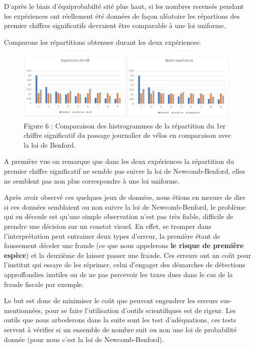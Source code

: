 \documentclass[
  12pt,
]{article}
\begin{document}
D'après le biais d'équiprobabilté sité plus haut, si les nombres
recensés pendant les expériences ont réellement été données de façon
aléatoire les répartions des premier chiffres significatifs devraient
être comparable à une loi uniforme.

Comparons les répartitions obtenues durant les deux expériences:

\begin{figure}
\centering
\includegraphics{Images/comparaison.png}
\caption{Figure 6 : Comparaison des histrogrammes de la répartition du
1er chiffre significatif du passage journalier de vélos en comparaison
avec la loi de Benford.}
\end{figure}

A première vue on remarque que dans les deux expériences la répartition
du premier chiffre significatif ne semble pas suivre la loi de
Newcomb-Benford, elles ne semblent pas non plus correspondre à une loi
uniforme.

Après avoir observé ces quelques jeux de données, nous étions en mesure
de dire si ces données semblaient ou non suivre la loi de
Newcomb-Benford, le problème qui en découle est qu'une simple
observation n'est pas très fiable, difficile de prendre une décision sur
un constat visuel. En effet, se tromper dans l'interprétation peut
entrainer deux types d'erreur, la première étant de faussement déceler
une fraude (ce que nous appelerons \textbf{le risque de première
espèce}) et la deuxième de laisser passer une fraude. Ces erreurs ont un
coût pour l'institut qui essaye de les réprimer, celui d'engager des
démarches de détections approffondies inutiles ou de ne pas percevoir
les taxes dues dans le cas de la fraude fiscale par exemple.

Le but est donc de minimiser le coût que peuvent engendrer les erreurs
sus-mentionnées, pour se faire l'utilisation d'outils scientifiques est
de rigeur. Les outils que nous arboderons dans la suite sont les test
d'adéquations, ces tests servent à vérifier si un ensemble de nombre
suit ou non une loi de probabilité donnée (pour nous c'est la loi de
Newcomb-Benford).
\end{document}
